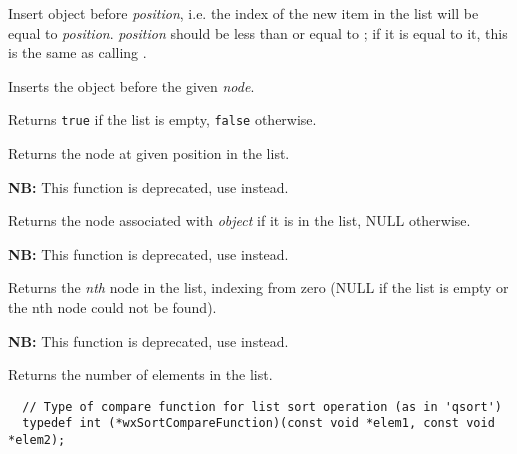 Insert object before {\it position}, i.e. the index of the new item in the
list will be equal to {\it position}. {\it position} should be less than or
equal to ; if it is equal to it, this is the
same as calling .


Inserts the object before the given {\it node}.

\label{wxlistisempty}


Returns {\tt true} if the list is empty, {\tt false} otherwise.

\label{wxlistitemfunc}


Returns the node at given position in the list.

\label{wxlistmember}


{\bf NB:} This function is deprecated, use  instead.

Returns the node associated with {\it object} if it is in the list, NULL otherwise.

\label{wxlistnth}


{\bf NB:} This function is deprecated, use  instead.

Returns the {\it nth} node in the list, indexing from zero (NULL if the list is empty
or the nth node could not be found).

\label{wxlistnumber}


{\bf NB:} This function is deprecated, use  instead.

Returns the number of elements in the list.

\label{wxlistsort}


\begin{verbatim}
  // Type of compare function for list sort operation (as in 'qsort')
  typedef int (*wxSortCompareFunction)(const void *elem1, const void *elem2);
\end{verbatim}

